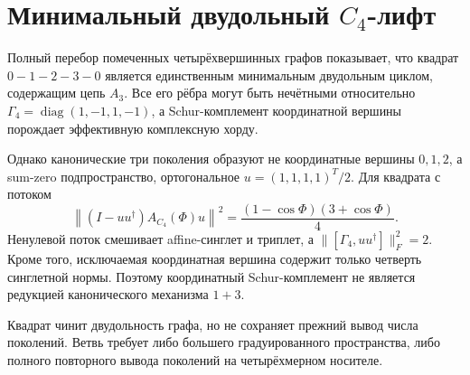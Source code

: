 \section*{Минимальный двудольный \(C_4\)-лифт}

Полный перебор помеченных четырёхвершинных графов показывает, что квадрат
\(0-1-2-3-0\) является единственным минимальным двудольным циклом,
содержащим цепь \(A_3\). Все его рёбра могут быть нечётными относительно
\(\Gamma_4=\operatorname{diag}(1,-1,1,-1)\), а Schur-комплемент координатной
вершины порождает эффективную комплексную хорду.

Однако канонические три поколения образуют не координатные вершины
\(0,1,2\), а sum-zero подпространство, ортогональное
\(u=(1,1,1,1)^T/2\). Для квадрата с потоком
\[
 \left\|(I-uu^\dagger)A_{C_4}(\Phi)u\right\|^2
 =\frac{(1-\cos\Phi)(3+\cos\Phi)}4.
\]
Ненулевой поток смешивает affine-синглет и триплет, а
\(\|[\Gamma_4,uu^\dagger]\|_F^2=2\). Кроме того, исключаемая координатная
вершина содержит только четверть синглетной нормы. Поэтому координатный
Schur-комплемент не является редукцией канонического механизма \(1+3\).

Квадрат чинит двудольность графа, но не сохраняет прежний вывод числа
поколений. Ветвь требует либо большего градуированного пространства, либо
полного повторного вывода поколений на четырёхмерном носителе.